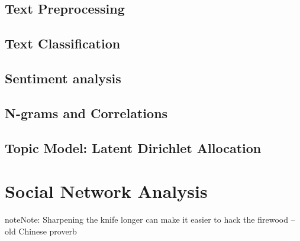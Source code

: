 \documentclass[letterpaper,11pt,english]{sphinxmanual}
\begin{document}
\section{Text Preprocessing}
\label{textmining:text-preprocessing}

\section{Text Classification}
\label{textmining:text-classification}

\section{Sentiment analysis}
\label{textmining:sentiment-analysis}

\section{N-grams and Correlations}
\label{textmining:n-grams-and-correlations}

\section{Topic Model: Latent Dirichlet Allocation}
\label{textmining:topic-model-latent-dirichlet-allocation}

\chapter{Social Network Analysis}
\label{socialnetwork:yassine-alouini}\label{socialnetwork:social-network-analysis}\label{socialnetwork::doc}\label{socialnetwork:socialnetwork}
\begin{notice}{note}{Note:}
Sharpening the knife longer can make it easier to hack the firewood -- old Chinese proverb
\end{notice}
\end{document}
